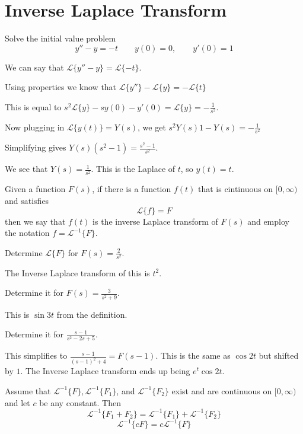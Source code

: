 \documentclass[../diffeq.tex]{subfiles}
\begin{document}
\section{Inverse Laplace Transform}
\begin{example}
    Solve the initial value problem 
    \[ y''-y=-t \qquad y(0)=0, \qquad y'(0)=1 \]

    We can say that $\mathcal{L}\{y''-y\}=\mathcal{L}\{-t\}$.

    Using properties we know that $\mathcal{L}\{y''\}-\mathcal{L}\{y\}=-\mathcal{L}\{t\}$

    This is equal to $s^2\mathcal{L}\{y\}-sy(0)-y'(0)=\mathcal{L}\{y\}=-\frac{1}{s^2}$.

    Now plugging in $\mathcal{L}\{y(t)\}=Y(s)$, we get $s^2Y(s)1-Y(s)=-\frac{1}{s^2}$

    Simplifying gives $Y(s)(s^2-1)=\frac{s^2-1}{s^2}$.

    We see that $Y(s)=\frac{1}{s^2}$. This is the Laplace of $t$, so $y(t)=t$.
\end{example}

\begin{definition}
    Given a function $F(s)$, if there is a function $f(t)$ that is cintinuous on $[0,\infty)$ and satisfies 
    \[ \mathcal{L}\{f\}=F \]
    then we say that $f(t)$ is the inverse Laplace transform of $F(s)$ and employ the notation $f=\mathcal{L}^{-1}\{F\}$.
\end{definition}

\begin{example}
    Determine $\mathcal{L}\{F\}$ for $F(s)=\frac{2}{s^2}$.

    The Inverse Laplace transform of this is $t^2$.

    Determine it for $F(s)=\frac{3}{s^2+9}$.

    This is $\sin 3t$ from the definition.

    Determine it for $\frac{s-1}{s^2-2s+5}$.

    This simplifies to $\frac{s-1}{(s-1)^2+4}=F(s-1)$. This is the same as $\cos 2t$ but shifted by $1$. The Inverse Laplace transform ends up being $e^t \cos 2t$.
\end{example}

\begin{theorem}
    Assume that $\mathcal{L}^{-1}\{F\}, \mathcal{L}^{-1}\{F_1\}$, and $\mathcal{L}^{-1}\{F_2\}$ exist and are continuous on $[0,\infty)$ and let $c$ be any constant. Then 
    \[ \mathcal{L}^{-1}\{F_1+F_2\} = \mathcal{L}^{-1}\{F_1\}+\mathcal{L}^{-1}\{F_2\} \]
    \[ \mathcal{L}^{-1}\{cF\} = c\mathcal{L}^{-1}\{F\} \]
\end{theorem}
\end{document}
